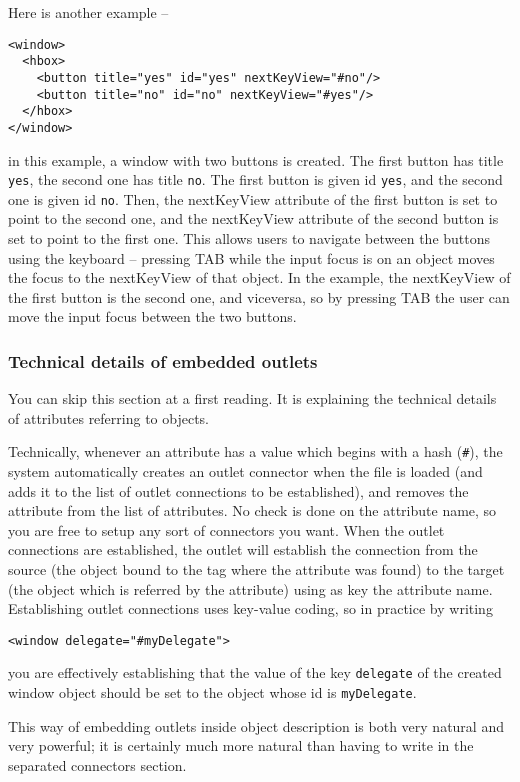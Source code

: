 Here is another example --
\begin{verbatim}
<window>
  <hbox>
    <button title="yes" id="yes" nextKeyView="#no"/>
    <button title="no" id="no" nextKeyView="#yes"/>
  </hbox>
</window>
\end{verbatim}
in this example, a window with two buttons is created.  The first
button has title \texttt{yes}, the second one has title \texttt{no}.
The first button is given id \texttt{yes}, and the second one is given
id \texttt{no}.  Then, the nextKeyView attribute of the first button
is set to point to the second one, and the nextKeyView attribute of
the second button is set to point to the first one.  This allows users
to navigate between the buttons using the keyboard -- pressing TAB
while the input focus is on an object moves the focus to the
nextKeyView of that object.  In the example, the nextKeyView of the
first button is the second one, and viceversa, so by pressing TAB the
user can move the input focus between the two buttons.

\subsubsection{Technical details of embedded outlets}
You can skip this section at a first reading.  It is explaining the
technical details of attributes referring to objects.

Technically, whenever an attribute has a value which begins with a
hash (\texttt{\#}), the system automatically creates an outlet
connector when the file is loaded (and adds it to the list of outlet
connections to be established), and removes the attribute from the
list of attributes.  No check is done on the attribute name, so you
are free to setup any sort of connectors you want.  When the outlet
connections are established, the outlet will establish the connection
from the source (the object bound to the tag where the attribute was
found) to the target (the object which is referred by the attribute)
using as key the attribute name.  Establishing outlet connections uses
key-value coding, so in practice by writing
\begin{verbatim}
<window delegate="#myDelegate">
\end{verbatim}
you are effectively establishing that the value of the key
\texttt{delegate} of the created window object should be set to the
object whose id is \texttt{myDelegate}.

This way of embedding outlets inside object description is both very
natural and very powerful; it is certainly much more natural than
having to write in the separated connectors section.

